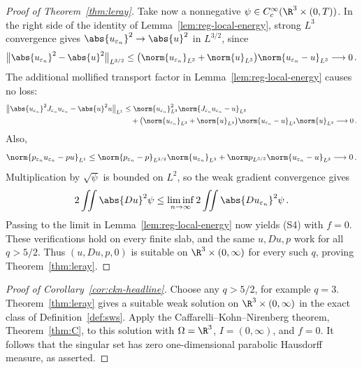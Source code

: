 \documentclass[11pt,reqno]{amsart}
\begin{document}
\begin{proof}[Proof of Theorem~\ref{thm:leray}]
Take now a nonnegative $\psi\in C_c^\infty(\R^3\times(0,T))$. In the
right side of the identity of Lemma~\ref{lem:reg-local-energy}, strong $L^3$ convergence gives
$\abs{u_{\varepsilon_n}}^2\to\abs{u}^2$ in $L^{3/2}$, since
\begin{equation*}
 \bigl\|\abs{u_{\varepsilon_n}}^2-\abs{u}^2\bigr\|_{L^{3/2}}
 \le \bigl(
\norm{u_{\varepsilon_n}}_{L^3}+
\norm{u}_{L^3}\bigr)
\norm{u_{\varepsilon_n}-u}_{L^3}\longrightarrow0\,.
\end{equation*}
The additional mollified transport factor in Lemma~\ref{lem:reg-local-energy} causes no loss:
\begin{equation}\label{eq:leray-energy-flux-limit}
\begin{aligned}
 \bigl\|\abs{u_{\varepsilon_n}}^2J_{\varepsilon_n}u_{\varepsilon_n}
                 -\abs{u}^2u\bigr\|_{L^1}
 &\le 
\norm{u_{\varepsilon_n}}_{L^3}^2
\norm{J_{\varepsilon_n}u_{\varepsilon_n}-u}_{L^3}\\
 &\quad+\bigl(
\norm{u_{\varepsilon_n}}_{L^3}+
\norm{u}_{L^3}\bigr)
\norm{u_{\varepsilon_n}-u}_{L^3}
\norm{u}_{L^3}
 \longrightarrow0\,.
\end{aligned}
\end{equation}
Also,
\begin{equation}\label{eq:leray-pressure-velocity-limit}
\norm{p_{\varepsilon_n}u_{\varepsilon_n}-pu}_{L^1}
 \le 
\norm{p_{\varepsilon_n}-p}_{L^{3/2}}
\norm{u_{\varepsilon_n}}_{L^3}
       +
\norm p_{L^{3/2}}
\norm{u_{\varepsilon_n}-u}_{L^3}
 \longrightarrow0\,.
\end{equation}
Multiplication by $\sqrt\psi$ is bounded on $L^2$, so the weak gradient
convergence gives
\begin{equation*}
 2\iint\abs{Du}^2\psi\le\liminf_{n\to\infty}
        2\iint\abs{Du_{\varepsilon_n}}^2\psi\,.
\end{equation*}
Passing to the limit in Lemma~\ref{lem:reg-local-energy} now yields (S4) with $f=0$. These verifications
hold on every finite slab, and the same $u,Du,p$ work for all
$q>5/2$. Thus $(u,Du,p,0)$ is suitable on $\R^3\times(0,\infty)$ for
every such $q$, proving Theorem~\ref{thm:leray}.
\end{proof}

\begin{proof}[Proof of Corollary~\ref{cor:ckn-headline}]
Choose any $q>5/2$, for example $q=3$. Theorem~\ref{thm:leray} gives a
suitable weak solution on $\R^3\times(0,\infty)$ in the exact class of
Definition~\ref{def:sws}. Apply the Caffarelli--Kohn--Nirenberg theorem, Theorem~\ref{thm:C}, to this solution with $\Omega=\R^3$, $I=(0,\infty)$,
and $f=0$. It follows that the singular set has zero one-dimensional
parabolic Hausdorff measure, as asserted.
\end{proof}
\end{document}
